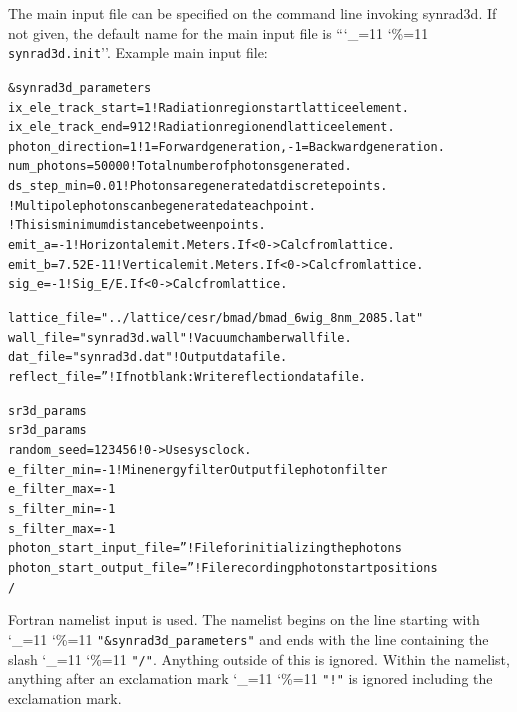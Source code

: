\documentclass[11pt]{article}
\newcommand\ttcmd{\begingroup\catcode`\_=11 \catcode`\%=11 \dottcmd}
\newcommand\dottcmd[1]{\texttt{#1}\endgroup}
\newcommand{\vn}{\ttcmd}
\newlength{\ExBeg}
\newlength{\ExEnd}
\newenvironment{example}
  {\vspace{\ExBeg} \begin{alltt}}
  {\end{alltt} \vspace{\ExEnd}}
\begin{document}
The main input file can be specified on the command line invoking synrad3d.
If not given, the default name for the main input file is ``\vn{synrad3d.init}''.
Example main input file:
\begin{example}
  &synrad3d_parameters
    ix_ele_track_start = 1    ! Radiation region start lattice element.
    ix_ele_track_end   = 912  ! Radiation region end lattice element.
    photon_direction = 1      ! 1 = Forward generation, -1 = Backward generation.
    num_photons      = 50000  ! Total number of photons generated. 
    ds_step_min      = 0.01   ! Photons are generated at discrete points. 
                              ! Multipole photons can be generated at each point.
                              ! This is minimum distance between points.
    emit_a       = -1         ! Horizontal emit. Meters. If < 0 -> Calc from lattice.
    emit_b       = 7.52E-11   ! Vertical emit.  Meters. If < 0 -> Calc from lattice.
    sig_e        = -1         ! Sig_E/E. If < 0 -> Calc from lattice.

    lattice_file = "../lattice/cesr/bmad/bmad_6wig_8nm_2085.lat" 
    wall_file    = "synrad3d.wall"   ! Vacuum chamber wall file.
    dat_file     = "synrad3d.dat"    ! Output data file.
    reflect_file = ''                ! If not blank: Write reflection data file. 

    sr3d_params%
    sr3d_params%
    random_seed = 123456                    ! 0 -> Use sys clock.
    e_filter_min = -1           ! Min energy filter Output file photon filter
    e_filter_max = -1
    s_filter_min = -1
    s_filter_max = -1
    photon_start_input_file  = ''  ! File for initializing the photons
    photon_start_output_file = ''  ! File recording photon start positions
  /
\end{example}
Fortran namelist input is used.
The namelist begins on the line starting with \vn{"\&synrad3d_parameters"}
and ends with the line containing the slash \vn{"/"}. Anything outside
of this is ignored. Within the namelist, anything after an exclamation
mark \vn{"!"} is ignored including the exclamation mark. 
\end{document}
